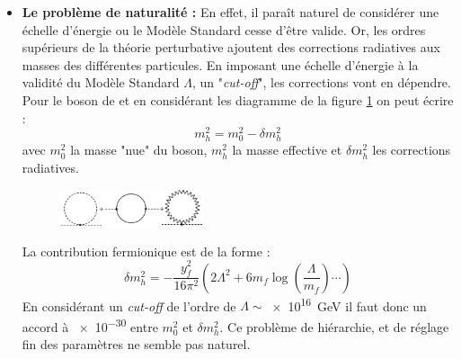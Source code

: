 \begin{itemize}[label=$\bullet$]
\item \textbf{Le problème de naturalité :} En effet, il paraît naturel de considérer une échelle d'énergie ou le Modèle Standard cesse d'être valide. Or, les ordres supérieurs de la théorie perturbative ajoutent des corrections radiatives aux masses des différentes particules. En imposant une échelle d'énergie à la validité du Modèle Standard $\Lambda$, un "\textit{cut-off}", les corrections vont en dépendre. Pour le boson de  et en considérant les diagramme de la figure \cref{corrections} on peut écrire :
\begin{equation}
m_{h}^{2}=m_{0}^{2}-\delta m_{h}^{2}
\end{equation}
avec $m_{0}^{2}$ la masse "nue" du boson, $m_{h}^{2}$ la masse effective et $\delta m_{h}^{2}$ les corrections radiatives.
\begin{figure}[ht!]
\centering
\includegraphics[width=0.40\textwidth]{SM/corrections.jpg}
\label{corrections}
\end{figure}
La contribution fermionique est de la forme :
\begin{equation}
\label{eq1}
\delta m_{h}^{2}=-\frac{y_{f}^{2}}{16\pi^{2}}\left(2\Lambda^{2}+6m_{f}\log\left(\frac{\Lambda}{m_{f}}\right)\cdots\right)
\end{equation}
En considérant un \textit{cut-off} de l'ordre de $\Lambda \sim$\SI{e16}{\giga\eV} il faut donc un accord à \num{e-30} entre $m_{0}^{2}$ et $\delta m_{h}^{2}$. Ce problème de hiérarchie, et de réglage fin des paramètres ne semble pas naturel.


\end{itemize}
